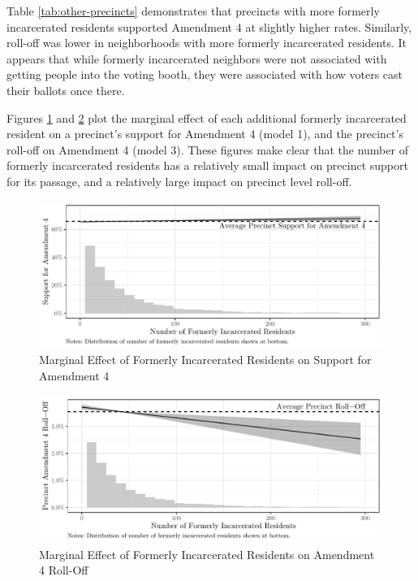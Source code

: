 \documentclass[
  12pt,
]{article}
\begin{document}
\begin{singlespace}


\end{singlespace}

Table \ref{tab:other-precincts} demonstrates that precincts with more formerly incarcerated residents supported Amendment 4 at slightly higher rates. Similarly, roll-off was lower in neighborhoods with more formerly incarcerated residents. It appears that while formerly incarcerated neighbors were not associated with getting people into the voting booth, they were associated with how voters cast their ballots once there.

Figures \ref{fig:marg-alt} and \ref{fig:marg-alt2} plot the marginal effect of each additional formerly incarcerated resident on a precinct's support for Amendment 4 (model 1), and the precinct's roll-off on Amendment 4 (model 3). These figures make clear that the number of formerly incarcerated residents has a relatively small impact on precinct support for its passage, and a relatively large impact on precinct level roll-off.

\begin{figure}[H]

{\centering \includegraphics{amendment_4_turnout_files/figure-latex/marg-alt-1} 

}

\caption{\label{fig:marg-alt}Marginal Effect of Formerly Incarcerated Residents on Support for Amendment 4}\label{fig:marg-alt}
\end{figure}
\begin{figure}[H]

{\centering \includegraphics{amendment_4_turnout_files/figure-latex/marg-alt2-1} 

}

\caption{\label{fig:marg-alt2}Marginal Effect of Formerly Incarcerated Residents on Amendment 4 Roll-Off}\label{fig:marg-alt2}
\end{figure}
\end{document}
